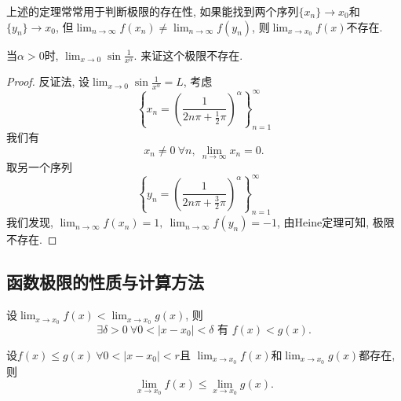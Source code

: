 
上述的定理常常用于判断极限的存在性, 如果能找到两个序列$\{ x_n \} \to x_0$和$\{ y_n \}\to x_0$, 但$\displaystyle \lim_{n \to \infty} f\left( x_n \right) \neq  \lim_{n \to \infty}f\left( y_n \right) $, 则$\lim_{x \to x_0} f\left( x \right) $不存在.

\begin{example}
    当$\alpha > 0 $时, $\displaystyle \lim_{x \to 0} \sin \frac{1}{x^{\alpha}}$. 来证这个极限不存在.
    \begin{proof}
        反证法, 设$\lim_{x \to 0}\sin \frac{1}{x^{\alpha}} = L$, 考虑
        \begin{equation}
          \left\{ x_n = \left( \frac{1}{2n \pi +\frac{1}{2}\pi} \right) ^{\alpha} \right\}_{n=1}^{\infty}
        \end{equation}
        我们有
        \begin{equation}
          x_n \neq 0\ \forall n, \ \lim_{n \to \infty} x_n = 0.
        \end{equation}
        取另一个序列
        \begin{equation}
          \left\{ y_n = \left( \frac{1}{2n\pi + \frac{3}{2}\pi} \right) ^{\alpha} \right\} _{n=1}^{\infty}
        \end{equation}
        我们发现, $\lim_{n \to \infty} f\left( x_n \right) = 1,\ \lim_{n \to \infty}f\left( y_n \right) = -1$, 由Heine定理可知, 极限不存在.
    \end{proof}
\end{example}

\subsection{函数极限的性质与计算方法}
\begin{proposition}\label{保持极限不等式}
    设$\displaystyle \lim_{x \to x_0} f\left( x \right) < \lim_{x \to x_0} g\left( x \right) $, 则
    \begin{equation}
      \exists \delta > 0 \ \forall 0 < \left| x-x_0 \right| < \delta \text{ 有 } f\left( x \right) < g\left( x \right) .
    \end{equation}
\end{proposition}

\begin{proposition}
    设$f\left( x \right) \le  g\left( x \right) \ \forall 0 < \left| x-x_0 \right| < r$且 $\displaystyle \lim_{x \to x_0} f\left( x \right) $和$\displaystyle  \lim_{x \to x_0} g\left( x \right) $都存在, 则
    \begin{equation}
      \lim_{x \to x_0} f\left( x \right) \le \lim_{x \to x_0} g\left( x \right) .
    \end{equation}
\end{proposition}

